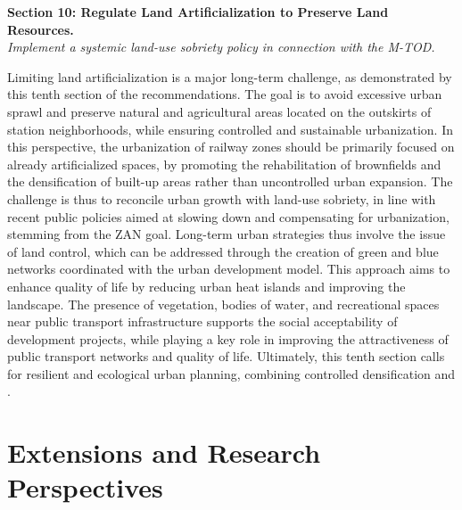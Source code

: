 \begin{refsegment}
    \begin{displayquote}
\textbf{Section 10: Regulate Land Artificialization to Preserve Land Resources.}
\\
\textsl{Implement a systemic land-use sobriety policy in connection with the \acrshort{M-TOD}.}
    \end{displayquote}
Limiting land artificialization is a major long-term challenge, as demonstrated by this tenth section of the recommendations. The goal is to avoid excessive urban sprawl and preserve natural and agricultural areas located on the outskirts of station neighborhoods, while ensuring controlled and sustainable urbanization. In this perspective, the urbanization of railway zones should be primarily focused on already artificialized spaces, by promoting the rehabilitation of brownfields and the densification of built-up areas rather than uncontrolled urban expansion. The challenge is thus to reconcile urban growth with land-use sobriety, in line with recent public policies aimed at slowing down and compensating for urbanization, stemming from the \acrfull{ZAN} goal. Long-term urban strategies thus involve the issue of land control, which can be addressed through the creation of green and blue networks coordinated with the urban development model. This approach aims to enhance quality of life by reducing urban heat islands and improving the landscape. The presence of vegetation, bodies of water, and recreational spaces near public transport infrastructure supports the social acceptability of development projects, while playing a key role in improving the attractiveness of public transport networks and quality of life. Ultimately, this tenth section calls for resilient and ecological urban planning, combining controlled densification and .%

\section*{Extensions and Research Perspectives
    \label{conclusion-generale:perspectives}
    }


\end{refsegment}
